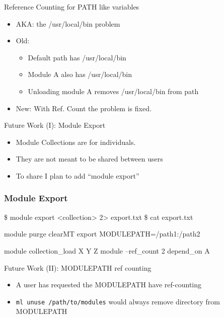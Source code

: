 \documentclass{beamer}
\begin{document}
\begin{frame}{Reference Counting for PATH like variables}
  \begin{itemize}
    \item AKA: the /usr/local/bin problem
    \item Old:
      \begin{itemize}
        \item Default path has /usr/local/bin
        \item Module A also has /usr/local/bin
        \item Unloading module A removes /usr/local/bin from path
      \end{itemize}
    \item New: With Ref. Count the problem is fixed.
  \end{itemize}
\end{frame}


\begin{frame}{Future Work (I): Module Export}
  \begin{itemize}
    \item Module Collections are for individuals.
    \item They are not meant to be shared between users
    \item To share I plan to add ``module export''
  \end{itemize}
\end{frame}


\begin{frame}[fragile]
    \frametitle{Module Export}
    {\tiny
\begin{semiverbatim}
    \$ module export <collection> 2> export.txt
    \$ cat export.txt

    module purge
    clearMT
    export MODULEPATH=/path1:/path2
    
    module collection_load X Y Z
    module --ref_count 2 depend_on A
\end{semiverbatim}
    }
\end{frame}

\begin{frame}{Future Work (II): MODULEPATH ref counting}
  \begin{itemize}
    \item A user has requested the MODULEPATH have ref-counting
    \item \texttt{ml unuse /path/to/modules} would always remove
      directory from MODULEPATH
  \end{itemize}
\end{frame}
\end{document}
